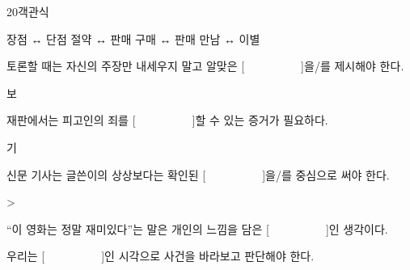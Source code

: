 \documentclass[fs95,seriesFre]{korfarm-base}
\begin{document}
\begin{kfQBlock}{20}{객관식}
\begin{kfChoices}
\kfChoice 장점 ↔ 단점
\kfChoice 절약 ↔ 판매
\kfChoice 구매 ↔ 판매
\kfChoice 만남 ↔ 이별
\end{kfChoices}
\end{kfQBlock}




\clearpage

\begin{kfChapterAreaList}
\end{kfChapterAreaList}



\kfActivityBg \par{}\par\nopagebreak[4]\smallskip\nopagebreak[4]
\begin{kfBlankList}
\kfBlankItem 토론할 때는 자신의 주장만 내세우지 말고 알맞은 [　　　　　]을/를 제시해야 한다.
\begin{kfEvidence}보\end{kfEvidence}
\kfBlankItem 재판에서는 피고인의 죄를 [　　　　　]할 수 있는 증거가 필요하다.
\begin{kfEvidence}기\end{kfEvidence}
\kfBlankItem 신문 기사는 글쓴이의 상상보다는 확인된 [　　　　　]을/를 중심으로 써야 한다.
\begin{kfEvidence}>\end{kfEvidence}
\kfBlankItem “이 영화는 정말 재미있다”는 말은 개인의 느낌을 담은 [　　　　　]인 생각이다.
\begin{kfEvidence}\end{kfEvidence}
\kfBlankItem 우리는 [　　　　　]인 시각으로 사건을 바라보고 판단해야 한다.
\begin{kfEvidence}\end{kfEvidence}
\end{kfBlankList}
\end{document}
